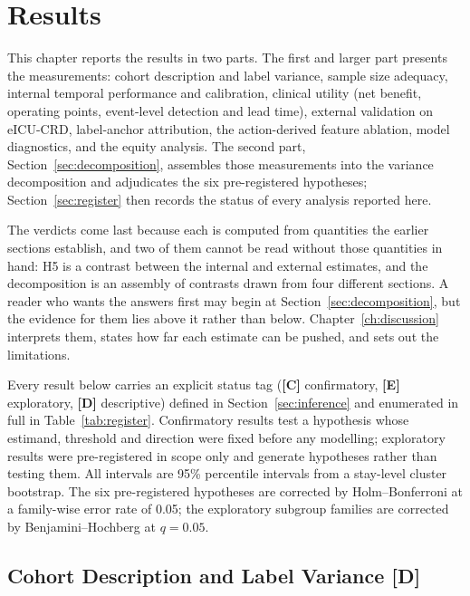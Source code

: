 \chapter{Results}
\label{ch:evaluation}

This chapter reports the results in two parts. The first and larger part
presents the measurements: cohort description and label variance, sample size
adequacy, internal temporal performance and calibration, clinical utility (net
benefit, operating points, event-level detection and lead time), external
validation on eICU-CRD, label-anchor attribution, the action-derived feature
ablation, model diagnostics, and the equity analysis. The second part,
Section~\ref{sec:decomposition}, assembles those measurements into the variance
decomposition and adjudicates the six pre-registered hypotheses;
Section~\ref{sec:register} then records the status of every analysis reported
here.

The verdicts come last because each is computed from quantities the earlier
sections establish, and two of them cannot be read without those quantities in
hand: H5 is a contrast between the internal and external estimates, and the
decomposition is an assembly of contrasts drawn from four different sections. A
reader who wants the answers first may begin at
Section~\ref{sec:decomposition}, but the evidence for them lies above it rather
than below.
Chapter~\ref{ch:discussion} interprets them, states how far each estimate can
be pushed, and sets out the limitations.

Every result below carries an explicit status tag (\textbf{[C]}
confirmatory, \textbf{[E]} exploratory, \textbf{[D]} descriptive) defined in
Section~\ref{sec:inference} and enumerated in full in
Table~\ref{tab:register}. Confirmatory results test a hypothesis whose
estimand, threshold and direction were fixed before any modelling; exploratory
results were pre-registered in scope only and generate hypotheses rather than
testing them. All intervals are 95\% percentile intervals from a stay-level
cluster bootstrap. The six pre-registered hypotheses are corrected by
Holm--Bonferroni at a family-wise error rate of 0.05; the exploratory subgroup
families are corrected by Benjamini--Hochberg at $q = 0.05$.



\section{Cohort Description and Label Variance \texorpdfstring{[D]}{[D]}}
\label{sec:cohort}


